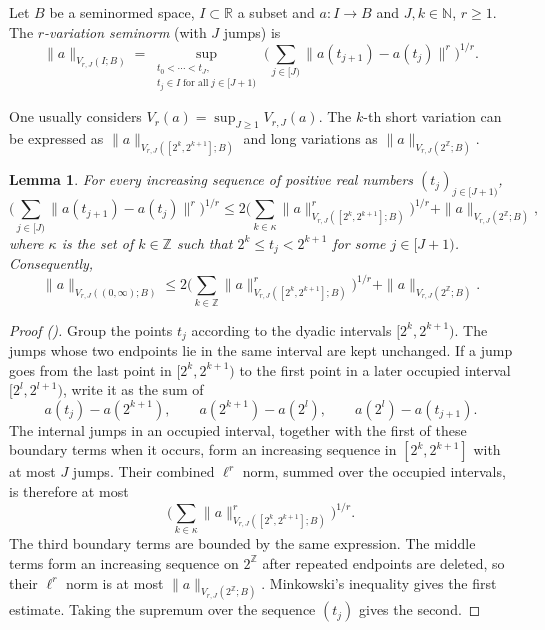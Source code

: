 \documentclass[12pt,reqno]{amsart}
\newcommand{\auto}{{({\tiny\faCar})}}
\theoremstyle{plain}
\newtheorem{lemma}[theorem]{Lemma}
\numberwithin{equation}{section}
\theoremstyle{remark}
\newcommand{\uses}[1]{}
\newcommand{\usesdefs}[1]{}
\newcommand{\Z}{{\mathbb Z}}
\begin{document}
Let $B$ be a seminormed space, $I\subset\mathbb{R}$ a subset and $a:I\to B$ and $J,k\in\mathbb{N}$, $r\ge 1$. The \emph{$r$-variation seminorm} (with $J$ jumps) is
\begin{equation}\label{auto:finite-variation-seminorm} \|a\|_{V_{r,J}(I; B)} = \sup_{\substack{t_0<\cdots<t_J,\\t_j\in I\;\text{for all}\;j\in [J+1)}} \Big(\sum_{j\in[J)} \|a(t_{j+1})- a(t_{j})\|^r\Big)^{1/r}. \end{equation}

One usually considers $V_r(a)=\sup_{J\ge 1} V_{r,J}(a)$.
The $k$-th short variation can be expressed as
$\|a\|_{V_{r,J}([2^k, 2^{k+1}]; B)}$
and long variations as
$\|a\|_{V_{r,J}(2^\mathbb{Z}; B)}.$


\begin{lemma}\label{lem:shortlongjumps}\uses{}\usesdefs{}
For every increasing sequence of positive real numbers $(t_j)_{j\in[J+1)}$,
\begin{equation}\label{auto:short-long-variation-decomposition}
\Big(\sum_{j\in[J)}\|a(t_{j+1})-a(t_j)\|^r\Big)^{1/r}
\le
2\Big(\sum_{k\in\kappa}\|a\|_{V_{r,J}([2^k,2^{k+1}];B)}^r\Big)^{1/r}
+\|a\|_{V_{r,J}(2^\Z;B)},
\end{equation}
where $\kappa$ is the set of $k\in\Z$ such that $2^k\le t_j<2^{k+1}$ for some $j\in[J+1)$. Consequently,
\begin{equation}\label{auto:global-short-long-variation-bound}
\|a\|_{V_{r,J}((0,\infty);B)}
\le
2\Big(\sum_{k\in\Z}\|a\|_{V_{r,J}([2^k,2^{k+1}];B)}^r\Big)^{1/r}
+\|a\|_{V_{r,J}(2^\Z;B)}.
\end{equation}
\end{lemma}
\begin{proof}[Proof \auto]
Group the points $t_j$ according to the dyadic intervals $[2^k,2^{k+1})$. The jumps whose two endpoints lie in the same interval are kept unchanged. If a jump goes from the last point in $[2^k,2^{k+1})$ to the first point in a later occupied interval $[2^l,2^{l+1})$, write it as the sum of
\[
a(t_j)-a(2^{k+1}),
\qquad
a(2^{k+1})-a(2^l),
\qquad
a(2^l)-a(t_{j+1}).
\]
The internal jumps in an occupied interval, together with the first of these boundary terms when it occurs, form an increasing sequence in $[2^k,2^{k+1}]$ with at most $J$ jumps. Their combined $\ell^r$ norm, summed over the occupied intervals, is therefore at most
\[
\Big(\sum_{k\in\kappa}\|a\|_{V_{r,J}([2^k,2^{k+1}];B)}^r\Big)^{1/r}.
\]
The third boundary terms are bounded by the same expression. The middle terms form an increasing sequence on $2^\Z$ after repeated endpoints are deleted, so their $\ell^r$ norm is at most $\|a\|_{V_{r,J}(2^\Z;B)}$. Minkowski's inequality gives the first estimate. Taking the supremum over the sequence $(t_j)$ gives the second.
\end{proof}
\end{document}
